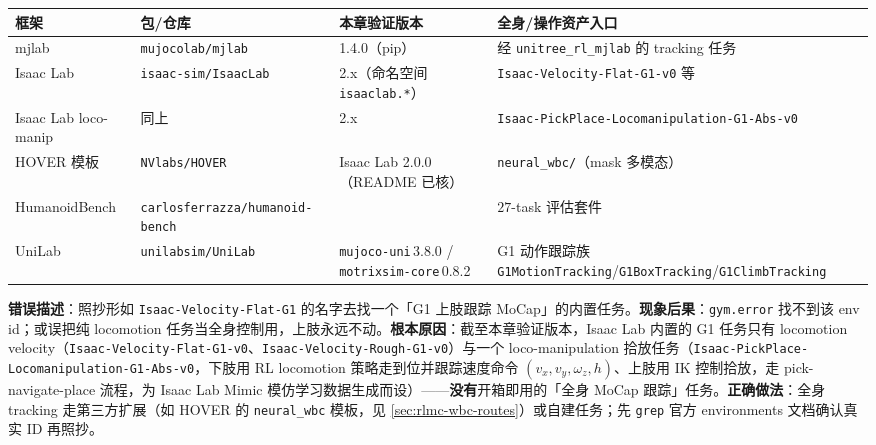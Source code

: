 \begin{center}
\small
\begin{tabularx}{\linewidth}{LlLL}
\hline
框架 & 包/仓库 & 本章验证版本 & 全身/操作资产入口 \\
\hline
mjlab & \texttt{mujocolab/\allowbreak mjlab} & 1.4.0（pip） & 经 \texttt{unitree\_rl\_mjlab} 的 tracking 任务 \\
Isaac Lab & \texttt{isaac-sim/\allowbreak IsaacLab} & 2.x（命名空间 \texttt{isaaclab.*}） & \texttt{Isaac-Velocity-Flat-G1-v0} 等 \\
Isaac Lab loco-manip & 同上 & 2.x & \texttt{Isaac-PickPlace-Locomanipulation-G1-Abs-v0} \\
HOVER 模板 & \texttt{NVlabs/\allowbreak HOVER} & Isaac Lab 2.0.0（README 已核） & \texttt{neural\_wbc/\allowbreak }（mask 多模态） \\
HumanoidBench & \texttt{carlosferrazza/\allowbreak humanoid-bench} &  & $27$-task 评估套件 \\
UniLab & \texttt{unilabsim/\allowbreak UniLab} & \texttt{mujoco-uni}\,3.8.0 / \texttt{motrixsim-core}\,0.8.2 & G1 动作跟踪族 \texttt{G1MotionTracking}/\allowbreak\texttt{G1BoxTracking}/\allowbreak\texttt{G1ClimbTracking}\cite{unilab2026} \\
\hline
\end{tabularx}
\end{center}

\begin{pitfall}
\textbf{错误描述}：照抄形如 \texttt{Isaac-Velocity-Flat-G1} 的名字去找一个「G1 上肢跟踪 MoCap」的内置任务。\textbf{现象后果}：\verb|gym.error| 找不到该 env id；或误把纯 locomotion 任务当全身控制用，上肢永远不动。\textbf{根本原因}：截至本章验证版本，Isaac Lab 内置的 G1 任务只有 locomotion velocity（\texttt{Isaac-Velocity-Flat-G1-v0}、\texttt{Isaac-Velocity-Rough-G1-v0}）与一个 loco-manipulation 拾放任务（\texttt{Isaac-PickPlace-Locomanipulation-G1-Abs-v0}，下肢用 RL locomotion 策略走到位并跟踪速度命令 $(v_x,v_y,\omega_z,h)$、上肢用 IK 控制拾放，走 pick-navigate-place 流程，为 Isaac Lab Mimic 模仿学习数据生成而设）——\textbf{没有}开箱即用的「全身 MoCap 跟踪」任务。\textbf{正确做法}：全身 tracking 走第三方扩展（如 HOVER 的 \texttt{neural\_wbc} 模板，见 \cref{sec:rlmc-wbc-routes}）或自建任务；先 \texttt{grep} 官方 environments 文档确认真实 ID 再照抄。
\end{pitfall}


